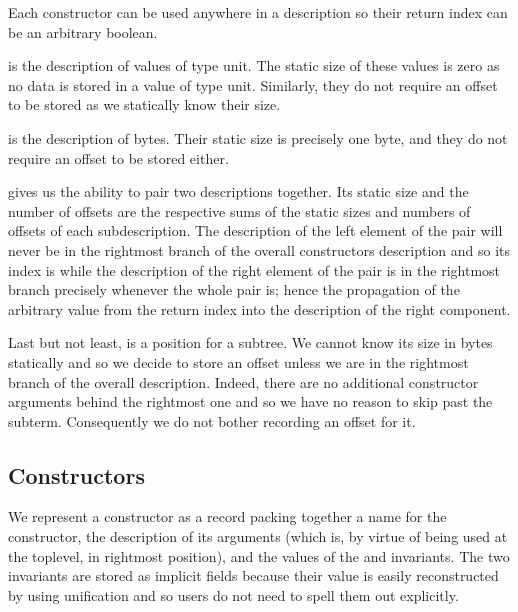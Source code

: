 
Each constructor can be used anywhere in a description so their return
 index can be an arbitrary boolean.

 is the description of values of type unit. The static
size of these values is zero as no data is stored in a value of type unit.
Similarly, they do not require an offset to be stored as we statically
know their size.

 is the description of bytes.
%
Their static size is precisely one byte, and they do not require an
offset to be stored either.

 gives us the ability to pair two descriptions together.
Its static size and the number of offsets are the respective sums of the
static sizes and numbers of offsets of each subdescription.
%
The description of the left element of the pair will never be in the
rightmost branch of the overall constructors description and so its
index is  while the description of the right element
of the pair is in the rightmost branch precisely whenever the whole pair
is; hence the propagation of the  arbitrary value from the
return index into the description of the right component.

Last but not least,  is a position for a subtree.
We cannot know its size in bytes statically and so we decide to store
an offset unless we are in the rightmost branch of the overall description.
%
Indeed, there are no additional constructor arguments behind the rightmost
one and so we have no reason to skip past the subterm. Consequently we
do not bother recording an offset for it.


\subsection{Constructors}

We represent a constructor as a record packing together
a name for the constructor,
the description of its arguments (which is, by virtue of
being used at the toplevel, in rightmost position),
and the values of the  and
 invariants.
%
The two invariants are stored as implicit fields
because their value is easily reconstructed by \idris{}
using unification and so users do not need
to spell them out explicitly.


